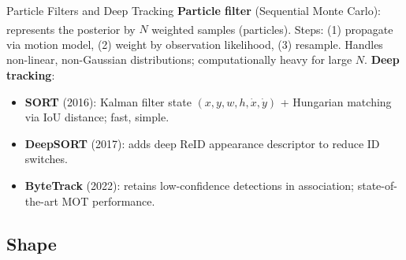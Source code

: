 \begin{v3topic}{Particle Filters and Deep Tracking}
    \textbf{Particle filter} (Sequential Monte Carlo): represents the posterior by $N$ weighted samples (particles)\textsuperscript{\cite[][pp.~548--553]{szeliski2022}}.
    Steps: (1) propagate via motion model, (2) weight by observation likelihood, (3) resample.
    Handles non-linear, non-Gaussian distributions; computationally heavy for large $N$.
\visualseparator
    \textbf{Deep tracking}:
    \begin{itemize}
        \item \textbf{SORT} (2016): Kalman filter state $(x,y,w,h,\dot{x},\dot{y})$ + Hungarian matching via IoU distance; fast, simple.
        \item \textbf{DeepSORT} (2017): adds deep ReID appearance descriptor to reduce ID switches.
        \item \textbf{ByteTrack} (2022): retains low-confidence detections in association; state-of-the-art MOT performance.
    \end{itemize}
\end{v3topic}

\subsection{Shape}

